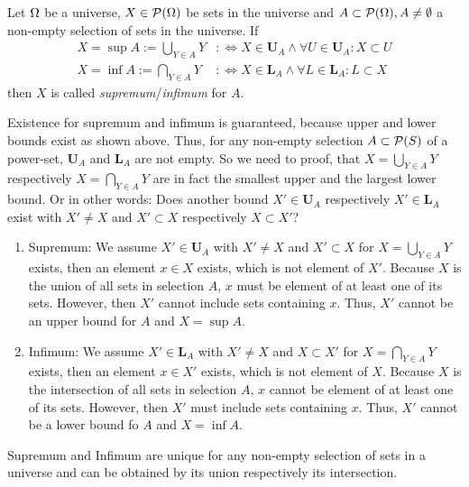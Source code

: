 \begin{definition}
\label{definition:SupremumAndInfimum}
Let $\Omega$ be a universe, $X \in \mathcal{P}(\Omega)$ be sets in the universe and $A \subset \mathcal{P}(\Omega), A \neq \emptyset$ a non-empty selection of sets in the universe.
If
\begin{align}
X 
= \sup A
:= \bigcup\limits_{Y \in A} Y
&:\Leftrightarrow
X \in \mathbf{U}_A \wedge \forall U \in \mathbf{U}_A : X \subset U
\\
X
= \inf A
:= \bigcap\limits_{Y \in A} Y
&:\Leftrightarrow
X \in \mathbf{L}_A \wedge \forall L \in \mathbf{L}_A : L \subset X
\end{align}
then $X$ is called \emph{supremum}/\emph{infimum} for $A$.
\end{definition}

Existence for supremum and infimum is guaranteed, because upper and lower bounds exist as shown above.
Thus, for any non-empty selection $A \subset \mathcal{P}(S)$ of a power-set, $\mathbf{U}_A$ and $\mathbf{L}_A$ are not empty.
So we need to proof, that $X = \bigcup\limits_{Y \in A} Y$ respectively $X = \bigcap\limits_{Y \in A} Y$ are in fact the smallest upper and the  largest lower bound.
Or in other words:
Does another bound $X' \in \mathbf{U}_A$ respectively $X' \in \mathbf{L}_A$ exist with $X' \neq X$ and $X' \subset X$ respectively $X \subset X'$?
\begin{enumerate}
\item
Supremum:
We assume $X' \in \mathbf{U}_A$ with $X' \neq X$ and $X' \subset X$ for $X = \bigcup\limits_{Y \in A} Y$ exists, then an element $x \in X$ exists, which is not element of $X'$.
Because $X$ is the union of all sets in selection $A$, $x$ must be element of at least one of its sets.
However, then $X'$ cannot include sets containing $x$.
Thus, $X'$ cannot be an upper bound for $A$ and $X = \sup A$.

\item
Infimum:
We assume $X' \in \mathbf{L}_A$ with $X' \neq X$ and $X \subset X'$ for $X = \bigcap\limits_{Y \in A} Y$ exists, then an element $x \in X'$ exists, which is not element of $X$.
Because $X$ is the intersection of all sets in selection $A$, $x$ cannot be element of at least one of its sets.
However, then $X'$ must include sets containing $x$.
Thus, $X'$ cannot be a lower bound fo $A$ and $X = \inf A$.

\end{enumerate}
Supremum and Infimum are unique for any non-empty selection of sets in a universe and can be obtained by its union respectively its intersection.
\cite{DBLP:books/sp/SchmidtS89}

